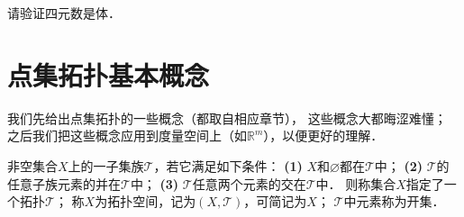 %
%


\begin{exercise}
	请验证四元数是体．
\end{exercise}

\section{点集拓扑基本概念}\label{chtop:sec_topology}
我们先给出点集拓扑的一些概念（都取自\parencite{munkres-2000-topology}相应章节），
这些概念大都晦涩难懂；
之后我们把这些概念应用到度量空间上（如$\mathbb{R}^m$），以便更好的理解．

\begin{definition}\label{chtop:def_top}
    非空集合$X$上的一子集族$\mathscr{T}$，若它满足如下条件：
    {\bfseries (1)} $X$和$\varnothing$都在$\mathscr{T}$中；
    {\bfseries (2)} $\mathscr{T}$的任意子族元素的并在$\mathscr{T}$中；
    {\bfseries (3)} $\mathscr{T}$任意两个元素的交在$\mathscr{T}$中．
    则称集合$X$指定了一个{\heiti 拓扑}$\mathscr{T}$；
    称$X$为{\heiti 拓扑空间}，记为$(X,\mathscr{T})$，可简记为$X$；
    $\mathscr{T}$中元素称为{\heiti 开集}．
\end{definition}

      
    
